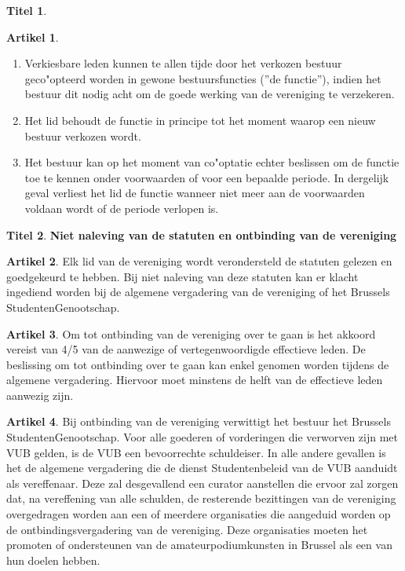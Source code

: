 \documentclass[a4paper,10pt]{article}
\theoremstyle{definition}
\newtheorem{titel}{\newline\Large Titel}
\newtheorem{artikelbase}{\large Artikel}
\newenvironment{artikel}
  {\begin{artikelbase}}
  {\smallskip
   \end{artikelbase}}
\newcommand{\ttext}[1]{\Large \textbf{#1} \normalsize}
\newcommand{\ttextcr}{\hfill\newline}
\newcommand{\ttextenum}{\mbox{}}
\begin{document}
\begin{titel}
  \begin{artikel}\label{bestuur-cooptatie}\ttextenum
    \begin{enumerate}
      \item
        Verkiesbare leden kunnen te allen tijde door het verkozen bestuur geco"opteerd worden in gewone bestuursfuncties (''de functie''), indien het bestuur dit nodig acht om de goede werking van de vereniging te verzekeren.
      \item
        Het lid behoudt de functie in principe tot het moment waarop een nieuw bestuur verkozen wordt.
      \item
        Het bestuur kan op het moment van co"optatie echter beslissen om de functie toe te kennen onder voorwaarden of voor een bepaalde periode.
        In dergelijk geval verliest het lid de functie wanneer niet meer aan de voorwaarden voldaan wordt of de periode verlopen is.
    \end{enumerate}
  \end{artikel}

\end{titel}


\begin{titel}\ttext{Niet naleving van de statuten en ontbinding van de vereniging}

  \begin{artikel}\ttextcr
    Elk lid van de vereniging wordt verondersteld de statuten gelezen en goedgekeurd te hebben.
    Bij niet naleving van deze statuten kan er klacht ingediend worden bij de algemene vergadering van de vereniging of het Brussels StudentenGenootschap.
  \end{artikel}

  \begin{artikel}\ttextcr
    Om tot ontbinding van de vereniging over te gaan is het akkoord vereist van 4/5 van de aanwezige of vertegenwoordigde effectieve leden.
    De beslissing om tot ontbinding over te gaan kan enkel genomen worden tijdens de algemene vergadering.
    Hiervoor moet minstens de helft van de effectieve leden aanwezig zijn.
  \end{artikel}

  \begin{artikel}\ttextcr
    Bij ontbinding van de vereniging verwittigt het bestuur het Brussels StudentenGenootschap.
    Voor alle goederen of vorderingen die verworven zijn met VUB gelden, is de VUB een bevoorrechte schuldeiser.
    In alle andere gevallen is het de algemene vergadering die de dienst Studentenbeleid van de VUB aanduidt als vereffenaar.
    Deze zal desgevallend een curator aanstellen die ervoor zal zorgen dat, na vereffening van alle schulden, de resterende bezittingen van de vereniging overgedragen worden aan een of meerdere organisaties die aangeduid worden op de ontbindingsvergadering van de vereniging.
    Deze organisaties moeten het promoten of ondersteunen van de amateurpodiumkunsten in Brussel als een van hun doelen hebben.
  \end{artikel}

\end{titel}
\end{document}
